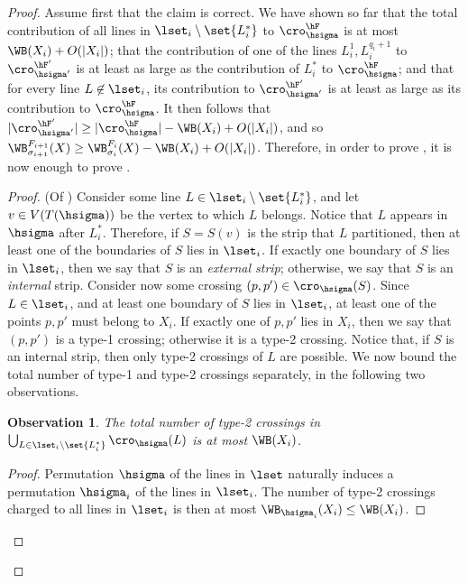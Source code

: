 \documentclass{toc}
\newtheorem{myobs}[theorem]{Observation}
\begin{document}
\begin{proof}
	Assume first that the claim is correct. We have shown so far that the total contribution of all lines in $\lset_i\setminus\set{L_i^*}$ to $\cro^{\hF}_{\hsigma}$ is at most $\WB(X_i)+O(|X_i|)$; that the contribution of one of the lines $L_i^1,L_i^{q_i+1}$ to $\cro^{\hF'}_{\hsigma'}$ is at least as large as the contribution of $L_i^*$ to $\cro^{\hF}_{\hsigma}$; and that for every line $L\not\in \lset_i$, its contribution to $\cro^{\hF'}_{\hsigma'}$ is at least as large as its contribution to $\cro^{\hF}_{\hsigma}$. It then follows that $|\cro^{\hF'}_{\hsigma'}|\geq |\cro^{\hF}_{\hsigma}|-\WB(X_i)+O(|X_i|)$, and so
	$\WB^{F_{i+1}}_{\sigma_{i+1}}(X)\geq \WB^{F_i}_{\sigma_i}(X)-\WB(X_i)+O(|X_i|)$. Therefore, in order to prove , it is now enough to prove .
	
	\begin{proof} (Of )
		Consider some line $L\in \lset_i\setminus\set{L_i^*}$, and let $v\in V(T({\hsigma}))$ be the vertex to which $L$ belongs. Notice that $L$ appears in $\hsigma$ after $L_i^*$. Therefore, if $S=S(v)$ is the strip that $L$ partitioned, then at least one of the boundaries of $S$ lies in $\lset_i$. If exactly one boundary of $S$ lies in $\lset_i$, then we say that $S$ is an \emph{external strip}; otherwise, we say that $S$ is an \emph{internal} strip. Consider now some crossing $(p,p')\in \cro_{\hsigma}(S)$. Since $L\in \lset_i$, and at least one boundary of $S$ lies in $\lset_i$, at least one of the points $p,p'$ must belong to $X_i$. If exactly one of $p,p'$ lies in $X_i$, then we say that $(p,p')$ is a type-1 crossing; otherwise it is a type-2 crossing. Notice that, if $S$ is an internal strip, then only type-2 crossings of $L$ are possible. We now bound the total number of type-1 and type-2 crossings separately, in the following two observations.
		
		
		\begin{myobs}\label{obs: type 2 crossings}
			The total number of type-2 crossings in $\bigcup_{L\in \lset_i\setminus\set{L_i^*}}\cro_{\hsigma}(L)$ is at most $\WB(X_i)$.
		\end{myobs}
		
		\begin{proof}
			Permutation $\hsigma$ of the lines in $\lset$ naturally induces a permutation $\hsigma_i$ of the lines in $\lset_i$. The number of type-2 crossings charged to all lines in $\lset_i$ is then at most $\WB_{\hsigma_i}(X_i)\leq \WB(X_i)$.%
		\end{proof}
		

\end{proof}
\end{proof}
\end{document}
